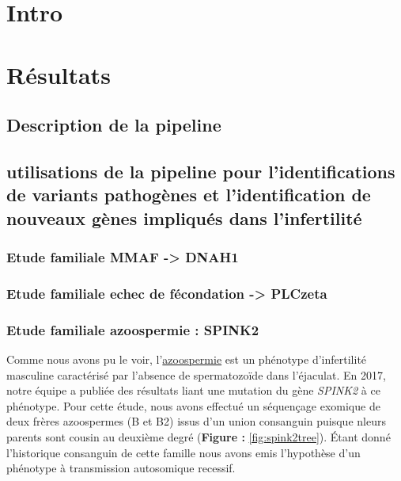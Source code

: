 \documentclass[12pt,twoside]{reedthesis}
\theoremstyle{definition}
\theoremstyle{definition}
\theoremstyle{remark}
\begin{document}
  \section{Intro}\label{intro}
  
  \section{Résultats}\label{resultats-1}
  
  \subsection{Description de la
  pipeline}\label{description-de-la-pipeline}
  
  \subsection{utilisations de la pipeline pour l'identifications de
  variants pathogènes et l'identification de nouveaux gènes impliqués dans
  l'infertilité}\label{utilisations-de-la-pipeline-pour-lidentifications-de-variants-pathogenes-et-lidentification-de-nouveaux-genes-impliques-dans-linfertilite}
  
  \subsubsection{Etude familiale MMAF -\textgreater{}
  DNAH1}\label{etude-familiale-mmaf---dnah1}
  
  \subsubsection{Etude familiale echec de fécondation -\textgreater{}
  PLCzeta}\label{etude-familiale-echec-de-fecondation---plczeta}
  
  \subsubsection{Etude familiale azoospermie :
  SPINK2}\label{etude-familiale-azoospermie-spink2}
  
  Comme nous avons pu le voir, l'\protect\hyperlink{infquant}{azoospermie}
  est un phénotype d'infertilité masculine caractérisé par l'absence de
  spermatozoïde dans l'éjaculat. En 2017, notre équipe a publiée des
  résultats liant une mutation du gène \emph{SPINK2} à ce phénotype. Pour
  cette étude, nous avons effectué un séquençage exomique de deux frères
  azoospermes (B et B2) issus d'un union consanguin puisque nleurs parents
  sont cousin au deuxième degré (\textbf{Figure : }\ref{fig:spink2tree}).
  Étant donné l'historique consanguin de cette famille nous avons emis
  l'hypothèse d'un phénotype à transmission autosomique recessif.
  
\end{document}
